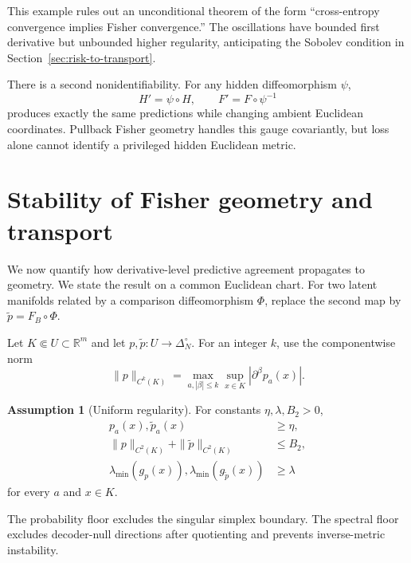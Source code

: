 \documentclass[11pt]{article}
\theoremstyle{definition}
\newtheorem{assumption}[theorem]{Assumption}
\theoremstyle{remark}
\newcommand{\simplex}{\Delta_{N}^{\circ}}
\newcommand{\R}{\mathbb{R}}
\begin{document}
This example rules out an unconditional theorem of the form ``cross-entropy convergence implies Fisher convergence.'' The oscillations have bounded first derivative but unbounded higher regularity, anticipating the Sobolev condition in Section~\ref{sec:risk-to-transport}.

There is a second nonidentifiability. For any hidden diffeomorphism $\psi$,
\begin{equation}
    H'=\psi\circ H,\qquad F'=F\circ\psi^{-1}
\end{equation}
produces exactly the same predictions while changing ambient Euclidean coordinates. Pullback Fisher geometry handles this gauge covariantly, but loss alone cannot identify a privileged hidden Euclidean metric.

\section{Stability of Fisher geometry and transport}\label{sec:stability}

We now quantify how derivative-level predictive agreement propagates to geometry. We state the result on a common Euclidean chart. For two latent manifolds related by a comparison diffeomorphism $\Phi$, replace the second map by $\widetilde p=F_B\circ\Phi$.

Let $K\Subset U\subset\R^m$ and let $p,\widetilde p:U\to\simplex$. For an integer $k$, use the componentwise norm
\begin{equation}
    \|p\|_{C^k(K)}=\max_{a,|\beta|\le k}\sup_{x\in K}|\partial^\beta p_a(x)|.
\end{equation}

\begin{assumption}[Uniform regularity]\label{ass:regularity}
For constants $\eta,\lambda,B_2>0$,
\begin{align}
    p_a(x),\widetilde p_a(x)&\ge\eta,\\
    \|p\|_{C^2(K)}+\|\widetilde p\|_{C^2(K)}&\le B_2,\\
    \lambda_{\min}(g_p(x)),\lambda_{\min}(g_{\widetilde p}(x))&\ge\lambda
\end{align}
for every $a$ and $x\in K$.
\end{assumption}

The probability floor excludes the singular simplex boundary. The spectral floor excludes decoder-null directions after quotienting and prevents inverse-metric instability.
\end{document}
